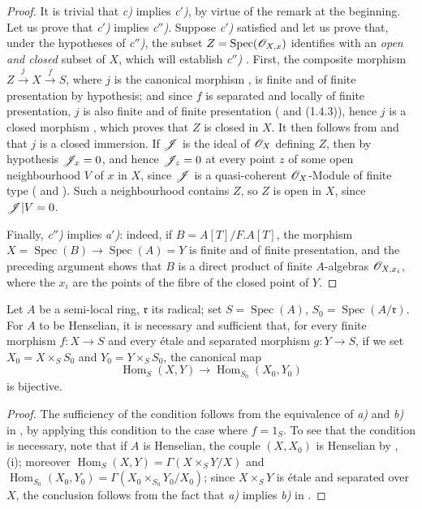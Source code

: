 \begin{proof}
It is trivial that \emph{c)} implies \emph{c$'$)}, by virtue of the remark at the beginning.
Let us prove that \emph{c$'$)} implies \emph{c$''$)}.
Suppose \emph{c$'$)} satisfied and let us prove that, under the hypotheses of \emph{c$''$)}, the subset $Z=\operatorname{Spec}(\mathscr{O}_{X,x})$ identifies with an \emph{open and closed} subset of $X$, which will establish \emph{c$''$)} .
First, the composite morphism $Z\xrightarrow{j}X\xrightarrow{f}S$, where $j$ is the canonical morphism , is finite and of finite presentation by hypothesis;
and since $f$ is separated and locally of finite presentation, $j$ is also finite and of finite presentation ( and (1.4.3)), hence $j$ is a closed morphism , which proves that $Z$ is closed in $X$.
It then follows from  and  that $j$ is a closed immersion.
If $\mathscr{J}$ is the ideal of $\mathscr{O}_X$ defining $Z$, then by hypothesis $\mathscr{J}_x=0$, and hence $\mathscr{J}_z=0$ at every point $z$ of some open neighbourhood $V$ of $x$ in $X$, since $\mathscr{J}$ is a quasi-coherent $\mathscr{O}_X$-Module of finite type ( and ).
Such a neighbourhood contains $Z$, so $Z$ is open in $X$, since $\mathscr{J}|V=0$.

Finally, \emph{c$''$)} implies \emph{a$'$)}:
indeed, if $B=A[T]/F.A[T]$, the morphism $X=\operatorname{Spec}(B)\to\operatorname{Spec}(A)=Y$ is finite and of finite presentation, and the preceding argument shows that $B$ is a direct product of finite $A$-algebras $\mathscr{O}_{X,x_i}$, where the $x_i$ are the points of the fibre of the closed point of $Y$.
\end{proof}

\begin{corollary}[18.5.12]
\label{IV.18.5.12}
Let $A$ be a semi-local ring, $\mathfrak{r}$ its radical;
set $S=\operatorname{Spec}(A)$, $S_0=\operatorname{Spec}(A/\mathfrak{r})$.
For $A$ to be Henselian, it is necessary and sufficient that, for every \textup{finite} morphism $f:X\to S$ and every \textup{\'etale and separated} morphism $g:Y\to S$, if we set $X_0=X\times_S S_0$ \textup{and} $Y_0=Y\times_S S_0$, the canonical map
\[
\operatorname{Hom}_S(X,Y)\to\operatorname{Hom}_{S_0}(X_0,Y_0)
\]
is bijective.
\end{corollary}

\begin{proof}
The sufficiency of the condition follows from the equivalence of \emph{a)} and \emph{b)} in , by applying this condition to the case where $f=1_S$.
To see that the condition is necessary, note that if $A$ is Henselian, the couple $(X,X_0)$ is Henselian by , (i);
moreover $\operatorname{Hom}_S(X,Y)=\Gamma(X\times_S Y/X)$ and $\operatorname{Hom}_{S_0}(X_0,Y_0)=\Gamma(X_0\times_{S_0}Y_0/X_0)$;
since $X\times_S Y$ is \'etale and separated over $X$, the conclusion follows from the fact that \emph{a)} implies \emph{b)} in .
\end{proof}

